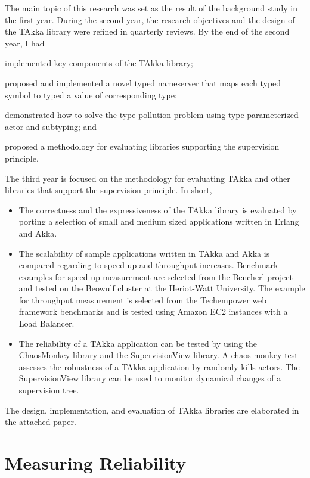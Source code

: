 \documentclass[11pt, a4paper, authoryear]{article}
\begin{document}
The main topic of this research was set as the result of the background study 
in the first year.  During the second year, the research objectives and the 
design of the TAkka library were refined in quarterly reviews.  By the end of 
the second year, I had
\begin{inparaenum}
\item implemented key components of the TAkka library;
\item proposed and implemented a novel typed nameserver that maps each typed 
symbol to typed a value of corresponding type;
\item demonstrated how to solve the type pollution problem using 
type-parameterized actor and subtyping; and 
\item proposed a methodology for evaluating libraries supporting the 
supervision principle.
\end{inparaenum} 

The third year is focused on the methodology for evaluating TAkka and other 
libraries that support the supervision principle.  In short,


\begin{itemize}
  \item The correctness and the expressiveness of the TAkka library is 
evaluated by porting a selection of small and medium sized applications written 
in Erlang and Akka.
  \item The scalability of sample applications written in TAkka and Akka is 
compared regarding to speed-up and throughput increases.  Benchmark examples 
for speed-up measurement are selected from the Bencherl project and tested on 
the Beowulf cluster at the Heriot-Watt University.  The example for throughput 
measurement is selected from the Techempower web framework benchmarks
\citep{techempower} and is tested using Amazon EC2 instances with a Load 
Balancer.
  \item The reliability of a TAkka application can be tested by using the 
ChaosMonkey library and the SupervisionView library.  A chaos monkey test 
assesses the robustness of a TAkka application by randomly kills actors.  The 
SupervisionView library can be used to monitor dynamical changes of a 
supervision tree.
\end{itemize}

The design, implementation, and evaluation of TAkka libraries are elaborated in 
the attached paper.



\section{Measuring Reliability}
\end{document}

